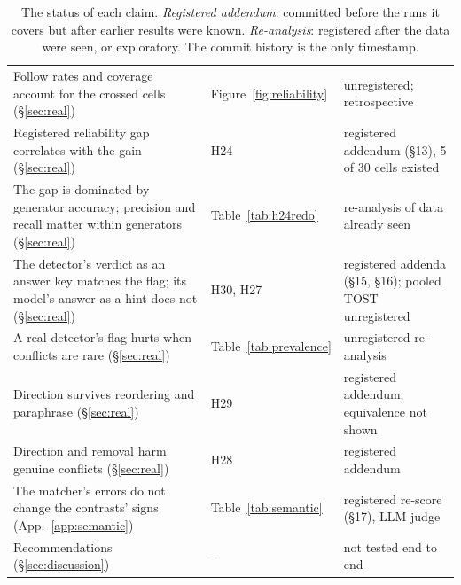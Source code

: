 \begin{table}[t]
\begin{tabular}{p{7.4cm}p{3.6cm}p{4.2cm}}
Follow rates and coverage account for the crossed cells (\S\ref{sec:real}) & Figure~\ref{fig:reliability} & unregistered; retrospective \\
Registered reliability gap correlates with the gain (\S\ref{sec:real}) & H24 & registered addendum (\S13), 5 of 30 cells existed \\
The gap is dominated by generator accuracy; precision and recall matter within generators (\S\ref{sec:real}) & Table~\ref{tab:h24redo} & re-analysis of data already seen \\
The detector's verdict as an answer key matches the flag; its model's answer as a hint does not (\S\ref{sec:real}) & H30, H27 & registered addenda (\S15, \S16); pooled TOST unregistered \\
A real detector's flag hurts when conflicts are rare (\S\ref{sec:real}) & Table~\ref{tab:prevalence} & unregistered re-analysis \\
Direction survives reordering and paraphrase (\S\ref{sec:real}) & H29 & registered addendum; equivalence not shown \\
Direction and removal harm genuine conflicts (\S\ref{sec:real}) & H28 & registered addendum \\
The matcher's errors do not change the contrasts' signs (App.~\ref{app:semantic}) & Table~\ref{tab:semantic} & registered re-score (\S17), LLM judge \\
Recommendations (\S\ref{sec:discussion}) & -- & not tested end to end \\
\bottomrule
\end{tabular}
\caption{The status of each claim. \emph{Registered addendum}: committed before the runs it covers but
after earlier results were known. \emph{Re-analysis}: registered after the data were seen, or exploratory. The commit
history is the only timestamp.}
\label{tab:claims}
\end{table}


